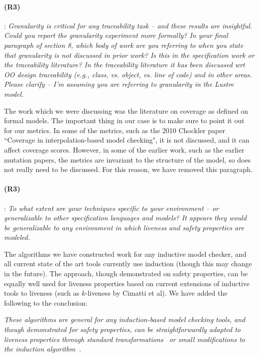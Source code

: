 \documentclass{article}
\begin{document}
\paragraph{(R3)}: \textit{Granularity is critical for any traceability task -- and these results are insightful. Could you report the granularity experiment more formally? In your final paragraph of section 8, which body of work are you referring to when you state that granularity is not discussed in prior work? Is this in the specification work or the traceability literature? In the traceability literature it has been discussed wrt OO design traceability (e.g., class, vs. object, vs. line of code) and in other areas. Please clarify -- I'm assuming you are referring to granularity in the Lustre model.}
\vspace{0.05in}

The work which we were discussing was the literature on coverage as defined on formal models.  The important thing in our case is to make sure to point it out for our metrics.  In some of the metrics, such as the 2010 Chockler paper ``Coverage in interpolation-based model checking", it is not discussed, and it can affect coverage scores.  However, in some of the earlier work, such as the earlier mutation papers, the metrics are invariant to the structure of the model, so does not really need to be discussed.  For this reason, we have removed this paragraph.


\paragraph{(R3)}: \textit{To what extent are your techniques specific to your environment -- or generalizable to other specification languages and models? It appears they would be generalizable to any environment in which liveness and safety properties are modeled.}
\vspace{0.05in}

The algorithms we have constructed work for any inductive model checker, and all current state of the art tools currently use induction (though this may change in the future).  The approach, though demonstrated on safety properties, can be equally well used for liveness properties based on current extensions of inductive tools to liveness (such as $k$-liveness by Cimatti et al).  We have added the following to the conclusion: 

\textit{These algorithms are general for any induction-based model checking tools, and though demonstrated for safety properties, can be straightforwardly adapted to liveness properties through standard transformations~\cite{Schuppan:2006} or small modifications to the induction algorithm~\cite{conf/fmcad/ClaessenS12}.}
\end{document}
